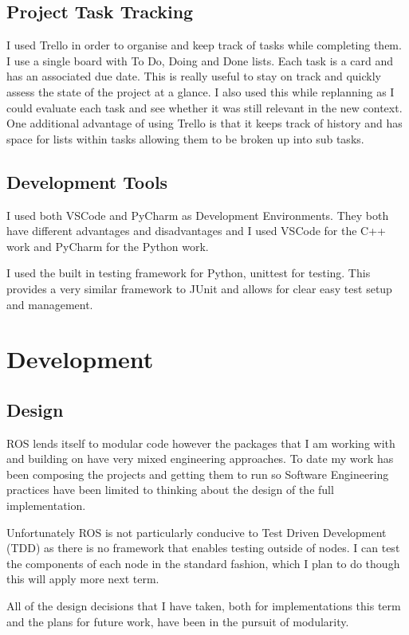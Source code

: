 \documentclass[]{../resources/final_report}
\begin{document}
\subsection{Project Task Tracking}
I used Trello in order to organise and keep track of tasks while completing them. I use a single board with To Do, Doing and Done lists. Each task is a card and has an associated due date.
This is really useful to stay on track and quickly assess the state of the project at a glance. I also used this while replanning as I could evaluate each task and see whether it was still relevant in the new context.
One additional advantage of using Trello is that it keeps track of history and has space for lists within tasks allowing them to be broken up into sub tasks.


\subsection{Development Tools}

I used both VSCode and PyCharm as Development Environments. They both have different advantages and disadvantages and I used VSCode for the C++ work and PyCharm for the Python work.

I used the built in testing framework for Python, unittest for testing. This provides a very similar framework to JUnit and allows for clear easy test setup and management.

\section{Development}

\subsection{Design}
ROS lends itself to modular code however the packages that I am working with and building on have very mixed engineering approaches.
To date my work has been composing the projects and getting them to run so Software Engineering practices have been limited to thinking about the design of the full implementation.

Unfortunately ROS is not particularly conducive to Test Driven Development (TDD) as there is no framework that enables testing outside of nodes. I can test the components of each node in the standard fashion, which I plan to do though this will apply more next term.

All of the design decisions that I have taken, both for implementations this term and the plans for future work, have been in the pursuit of modularity.
\end{document}
